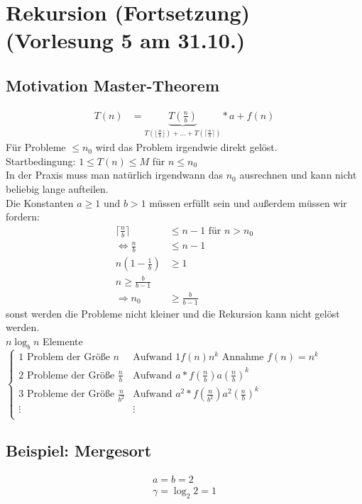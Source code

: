 \section{Rekursion (Fortsetzung) \tiny (Vorlesung 5 am 31.10.)}
\subsection{ Motivation Master-Theorem}
\begin{align*}
T(n) &= \underbrace{ T(\frac{n}{b}) }_{T( \lfloor \frac{n}{b} \rfloor) + \dots + T(\lceil \frac{n}{b}\rceil)}* a + f(n)
\end{align*}
Für Probleme $\leq n_0$ wird das Problem irgendwie direkt gelöst.\\
Startbedingung: $1 \leq T(n) \leq M$ für $n\leq n_0$\\

In der Praxis muss man natürlich irgendwann das $n_0$ ausrechnen und kann nicht beliebig lange aufteilen.\\
Die Konstanten $a \geq 1$ und $b > 1$ müssen erfüllt sein und außerdem müssen wir fordern:
\begin{align*}
\lceil \frac{n}{b} \rceil &\leq n-1 \text{ für } n > n_0\\
\Leftrightarrow \frac{n}{b} &\leq n-1\\
n(1-\frac{1}{b}) &\geq 1\\
n \geq \frac{b}{b-1}\\
\Rightarrow n_0 &\geq \frac{b}{b-1}
\end{align*}
sonst werden die Probleme nicht kleiner und die Rekursion kann nicht gelöst werden.\\
$n \log_b n$ Elemente
$\begin{cases}
1 \text{ Problem der Größe } n & \text{Aufwand }  1f(n)  n^k \text{ Annahme }f(n)=n^k\\
2 \text{ Probleme der Größe } \frac{n}{b} &\text{Aufwand }  a*f(\frac{n}{b})  a(\frac{n}{b})^k\\
3 \text{ Probleme der Größe } \frac{n}{b^2} &\text{Aufwand }  a^2*f(\frac{n}{b^2})  a^2(\frac{n}{b})^k\\
\vdots & \vdots \\

\end{cases}$
\subsection*{Beispiel: Mergesort}
\begin{align*}
a = b = 2\\
\gamma = \log_2 2  =1\\
\end{align*}

